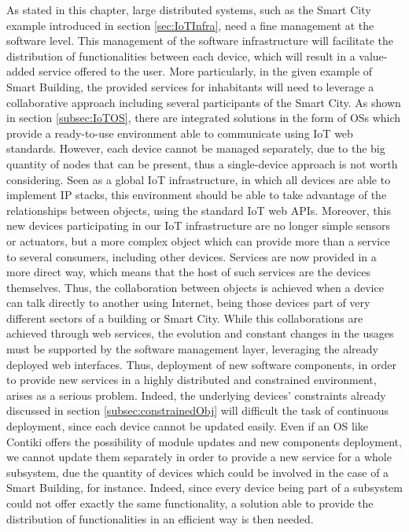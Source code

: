 As stated in this chapter, large distributed systems, such as the Smart City example introduced in section \ref{sec:IoTInfra}, need a fine management at the software level.
This management of the software infrastructure will facilitate the distribution of functionalities between each device, which will result in a value-added service offered to the user.
More particularly, in the given example of Smart Building, the provided services for inhabitants will need to leverage a collaborative approach including several participants of the Smart City.
As shown in section \ref{subsec:IoTOS}, there are integrated solutions in the form of OSs which provide a ready-to-use environment able to communicate using IoT web standards.
However, each device cannot be managed separately, due to the big quantity of nodes that can be present, thus a single-device approach is not worth considering.
Seen as a global IoT infrastructure, in which all devices are able to implement IP stacks, this environment should be able to take advantage of the relationships between objects, using the standard IoT web APIs.
Moreover, this new devices participating in our IoT infrastructure are no longer simple sensors or actuators, but a more complex object which can provide more than a service to several consumers, including other devices.
Services are now provided in a more direct way, which means that the host of such services are the devices themselves.
Thus, the collaboration between objects is achieved when a device can talk directly to another using Internet, being those devices part of very different sectors of a building or Smart City.
While this collaborations are achieved through web services, the evolution and constant changes in the usages must be supported by the software management layer, leveraging the already deployed web interfaces.
Thus, deployment of new software components, in order to provide new services in a highly distributed and constrained environment, arises as a serious problem.
Indeed, the underlying devices' constraints already discussed in section \ref{subsec:constrainedObj} will difficult the task of continuous deployment, since each device cannot be updated easily.
Even if an OS like Contiki offers the possibility of module updates and new components deployment, we cannot update them separately in order to provide a new service for a whole subsystem, due the quantity of devices which could be involved in the case of a Smart Building, for instance.
Indeed, since every device being part of a subsystem could not offer exactly the same functionality, a solution able to provide the distribution of functionalities in an efficient way is then needed.

